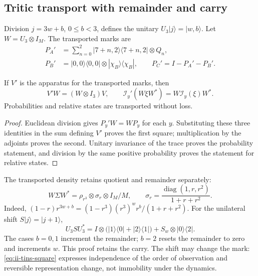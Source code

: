 \subsection{Tritic transport with remainder and carry}
\label{subsec:ii-tins-tritico}

Division $j=3w+b$, $0\le b<3$, defines the unitary
$U_3|j\rangle=|w,b\rangle$. Let $W=U_3\otimes I_M$. The transported marks are
\begin{align}
 P_A'&=\sum_{n=0}^2|7+n,2\rangle\langle7+n,2|\otimes Q_n,\nonumber\\
 P_B'&=|0,0\rangle\langle0,0|\otimes|\chi_B\rangle\langle \chi_B|,
 \qquad P_C'=I-P_A'-P_B'.
 \label{eq:ii-tins-tritic-marks}
\end{align}

\begin{proposition}
\label{prop:ii-tins-tritic}
If $V'$ is the apparatus for the transported marks, then
\begin{equation}
 V'W=(W\otimes I_3)V,\qquad
 \mathcal I_y'(W\xi W^*)=W\mathcal I_y(\xi)W^*.
 \label{eq:ii-tins-square}
\end{equation}
Probabilities and relative states are transported without loss.
\end{proposition}
\begin{proof}
Euclidean division gives $P_y'W=WP_y$ for each $y$. Substituting these
three identities in the sum defining $V'$ proves the first square;
multiplication by the adjoints proves the second. Unitary invariance of
the trace proves the probability statement, and division by the same
positive probability proves the statement for relative states.
\end{proof}

The transported density retains quotient and remainder separately:
\begin{equation}
 W\Sigma W^*=\rho_{r^3}\otimes\sigma_r\otimes I_M/M,
 \qquad \sigma_r=\frac{\operatorname{diag}(1,r,r^2)}{1+r+r^2}.
 \label{eq:ii-tins-tritic-state}
\end{equation}
Indeed, $(1-r)r^{3w+b}=(1-r^3)(r^3)^w r^b/(1+r+r^2)$.
For the unilateral shift $S|j\rangle=|j+1\rangle$,
\begin{equation}
 U_3SU_3^*=I\otimes\bigl(|1\rangle\langle0|+|2\rangle\langle1|\bigr)
 +S_w\otimes|0\rangle\langle2|.
 \label{eq:ii-tins-carry}
\end{equation}
The cases $b=0,1$ increment the remainder; $b=2$ resets the remainder to
zero and increments $w$. This proof retains the carry. The shift may
change the mark: \eqref{eq:ii-tins-square} expresses independence of the
order of observation and reversible representation change, not immobility
under the dynamics.

